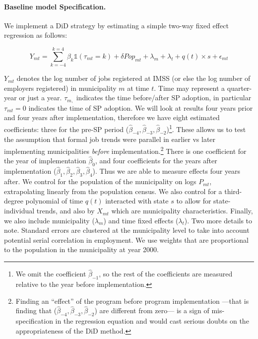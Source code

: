 \documentclass[oneside,11pt]{article}
\begin{document}
\paragraph{Baseline model Specification.} We implement a DiD strategy by estimating a simple two-way fixed effect regression as follows:

\begin{equation} \label{DID_eqn}
  Y_{mt}=\sum_{k=-4}^{k=4}\beta_{k}\mathds{1}(\tau_{mt}=k)+\delta Pop_{mt} + \lambda_m + \lambda_t + q(t)\times s + \epsilon_{mt}
\end{equation}
 
\noindent $Y_{mt}$ denotes the log number of jobs registered at IMSS (or else the log number of employers registered) in municipality $m$ at time $t$. Time may represent a quarter-year or just a year.  $\tau_{m,}$ indicates the time before/after SP adoption, in particular $\tau_{mt}=0$ indicates the time of SP adoption. We will look at results four years prior and four years after implementation, therefore we have eight estimated coefficients: three for the pre-SP period ($\hat{\beta}_{-4}, \hat{\beta}_{-3}, \hat{\beta}_{-2}$)\footnote{We omit the coefficient $\hat{\beta}_{-1}$, so the rest of the coefficients are measured relative to the year before implementation.}. These allows us to test the assumption that formal job trends were parallel in earlier vs later implementing municipalities \textit{before} implementation.\footnote{Finding an ``effect'' of the program before program implementation ---that is finding that ($\hat{\beta}_{-4}, \hat{\beta}_{-3}, \hat{\beta}_{-2}$) are different from zero--- is a sign of mis-specification in the regression equation and would cast serious doubts on the appropriateness of the DiD method.} There is one coefficient for the year of implementation $\hat{\beta}_{0}$, and four coefficients for the years after implementation ($\hat{\beta}_{1}, \hat{\beta}_{2}, \hat{\beta}_{3}, \hat{\beta}_{4}$). Thus we are able to measure effects four years after. We control for the population of the municipality on logs $P_{mt}$, extrapolating linearly from the population census. We also control for a third-degree polynomial of time $q(t)$ interacted with state $s$ to allow for state-individual trends, and also by $X_{mt}$ which are municipality characteristics. Finally, we also include municipality ($\lambda_m$) and time fixed effects ($\lambda_t$). Two more details to note. Standard errors are clustered at the municipality level to take into account potential serial correlation in employment. We use weights that are proportional to the population in the municipality at year 2000. 
\end{document}
